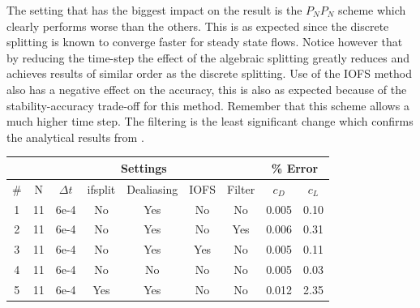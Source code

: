 The setting that has the biggest impact on the result is the $P_NP_N$ scheme which clearly performs 
worse than the others. This is as expected since the discrete splitting is known to converge faster
for steady state flows. Notice however that by reducing the time-step the effect of the algebraic splitting
greatly reduces and achieves results of similar order as the discrete splitting.
Use of the IOFS method also has a negative effect on the accuracy,
this is also as expected because of the stability-accuracy trade-off for this method.
Remember that this scheme allows a much higher time step. The filtering is the least significant change
which confirms the analytical results from . 
%
\begin{table}[h]
    \centering
    \begin{tabular}{c | c c c c c c | c c }
         & \multicolumn{6}{|c|}{Settings} & \multicolumn{2}{|c}{\% Error} \\\hline
         \# & N & $\Delta t$ & ifsplit & Dealiasing & IOFS & Filter & $c_D$ & $c_L$ \\  \hline 
         1 &11& 6e-4& No & Yes& No & No & 0.005 & 0.10\\
         2 &11& 6e-4& No & Yes& No & Yes& 0.006 & 0.31\\
         3 &11& 6e-4& No & Yes& Yes& No & 0.005 & 0.11\\
         4 &11& 6e-4& No & No & No & No & 0.005 & 0.03\\
         5 &11& 6e-4& Yes& Yes& No & No & 0.012 & 2.35\\





\end{tabular}
\end{table}
